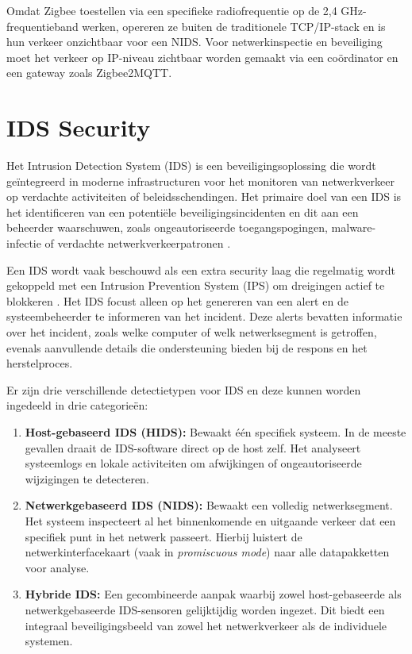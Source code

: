 \vspace{1em}

Omdat Zigbee toestellen via een specifieke radiofrequentie op de 2,4 GHz-frequentieband werken, opereren ze buiten de traditionele TCP/IP-stack en is hun verkeer onzichtbaar voor een NIDS. Voor netwerkinspectie en beveiliging moet het verkeer op IP-niveau zichtbaar worden gemaakt via een coördinator en een gateway zoals Zigbee2MQTT.


\section{IDS Security}

Het Intrusion Detection System (IDS) is een beveiligingsoplossing die wordt geïntegreerd in moderne infrastructuren voor het monitoren van netwerkverkeer op verdachte activiteiten of beleidsschendingen. Het primaire doel van een IDS is het identificeren van een potentiële beveiligingsincidenten en dit aan een beheerder waarschuwen, zoals ongeautoriseerde toegangspogingen, malware-infectie of verdachte netwerkverkeerpatronen \autocite{LIAO201316}.

\vspace{1em}

Een IDS wordt vaak beschouwd als een extra security laag die regelmatig wordt gekoppeld met een Intrusion Prevention System (IPS) om dreigingen actief te blokkeren \autocite{inproceedings}. Het IDS focust alleen op het genereren van een alert en de systeembeheerder te informeren van het incident. Deze alerts bevatten informatie over het incident, zoals welke computer of welk netwerksegment is getroffen, evenals aanvullende details die ondersteuning bieden bij de respons en het herstelproces.

\vspace{1em}
Er zijn drie verschillende detectietypen voor IDS en deze kunnen worden ingedeeld in drie categorieën:

\begin{enumerate}
    \item \textbf{Host-gebaseerd IDS (HIDS):} Bewaakt één specifiek systeem. In de meeste gevallen draait de IDS-software direct op de host zelf. Het analyseert systeemlogs en lokale activiteiten om afwijkingen of ongeautoriseerde wijzigingen te detecteren.
    
    \item \textbf{Netwerkgebaseerd IDS (NIDS):} Bewaakt een volledig netwerksegment. Het systeem inspecteert al het binnenkomende en uitgaande verkeer dat een specifiek punt in het netwerk passeert. Hierbij luistert de netwerkinterfacekaart (vaak in \textit{promiscuous mode}) naar alle datapakketten voor analyse.
    
    \item \textbf{Hybride IDS:} Een gecombineerde aanpak waarbij zowel host-gebaseerde als netwerkgebaseerde IDS-sensoren gelijktijdig worden ingezet. Dit biedt een integraal beveiligingsbeeld van zowel het netwerkverkeer als de individuele systemen.
\end{enumerate}

